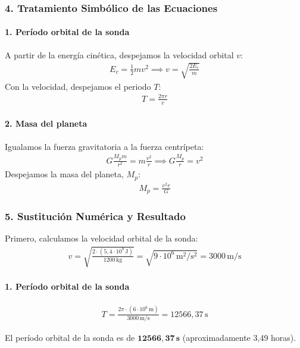 \subsubsection*{4. Tratamiento Simbólico de las Ecuaciones}
\paragraph{1. Período orbital de la sonda}
A partir de la energía cinética, despejamos la velocidad orbital $v$:
\begin{gather}
    E_c = \frac{1}{2}mv^2 \implies v = \sqrt{\frac{2E_c}{m}}
\end{gather}
Con la velocidad, despejamos el periodo $T$:
\begin{gather}
    T = \frac{2\pi r}{v}
\end{gather}

\paragraph{2. Masa del planeta}
Igualamos la fuerza gravitatoria a la fuerza centrípeta:
\begin{gather}
    G \frac{M_p m}{r^2} = m \frac{v^2}{r} \implies G \frac{M_p}{r} = v^2
\end{gather}
Despejamos la masa del planeta, $M_p$:
\begin{gather}
    M_p = \frac{v^2 r}{G}
\end{gather}

\subsubsection*{5. Sustitución Numérica y Resultado}
Primero, calculamos la velocidad orbital de la sonda:
\begin{gather}
    v = \sqrt{\frac{2 \cdot (5,4 \cdot 10^9\,\text{J})}{1200\,\text{kg}}} = \sqrt{9 \cdot 10^6\,\text{m}^2/\text{s}^2} = 3000\,\text{m/s}
\end{gather}

\paragraph{1. Período orbital de la sonda}
\begin{gather}
    T = \frac{2\pi \cdot (6 \cdot 10^6\,\text{m})}{3000\,\text{m/s}} = 12566,37\,\text{s}
\end{gather}
\begin{cajaresultado}
El período orbital de la sonda es de $\boldsymbol{12566,37\,\textbf{s}}$ (aproximadamente 3,49 horas).
\end{cajaresultado}

